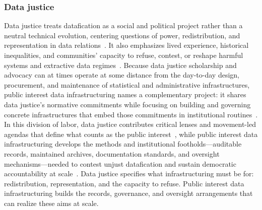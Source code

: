 \documentclass[acmsmall,screen]{acmart}
\begin{document}
\subsubsection*{Data justice}
Data justice treats datafication as a social and political project rather than a neutral technical evolution, centering questions of power, redistribution, and representation in data relations~\cite{taylorWhatDataJustice2017,dignazioDataFeminism2020,braunDataJusticeData2022}. It also emphasizes lived experience, historical inequalities, and communities' capacity to refuse, contest, or reshape harmful systems and extractive data regimes~\cite{zongDataRefusalFramework2024,garciaNoReimaginingData2022,dencikRescuingDataJustice2025}. Because data justice scholarship and advocacy can at times operate at some distance from the day-to-day design, procurement, and maintenance of statistical and administrative infrastructures, public interest data infrastructuring names a complementary project: it shares data justice's normative commitments while focusing on building and governing concrete infrastructures that embed those commitments in institutional routines~\cite{taylorWhatDataJustice2017,acker_DataCraftTheory_2019,hutchinsonAccountabilityMachineLearning2021}. In this division of labor, data justice contributes critical lenses and movement-led agendas that define what counts as the public interest~\cite{dignazioDataFeminism2020,braunDataJusticeData2022}, while public interest data infrastructuring develops the methods and institutional footholds---auditable records, maintained archives, documentation standards, and oversight mechanisms---needed to contest unjust datafication and sustain democratic accountability at scale~\cite{schwartz_archives_2002,acker_DataCraftTheory_2019,hutchinsonAccountabilityMachineLearning2021}. Data justice specifies what infrastructuring must be for: redistribution, representation, and the capacity to refuse. Public interest data infrastructuring builds the records, governance, and oversight arrangements that can realize these aims at scale.
\end{document}
